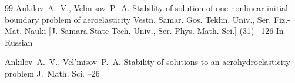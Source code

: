 \begin{thebibliography}{99}
\by Ankilov~A.~V., Velmisov~P.~A.
\paper Stability of solution of one nonlinear initial-boundary problem of aeroelasticity
\jour Vestn. Samar. Gos. Tekhn. Univ., Ser. Fiz.-Mat. Nauki \rm  [J. Samara State Tech. Univ., Ser. Phys. Math. Sci.]
(31)
--126
\lang In Russian

\by Ankilov~A.~V., Vel'misov~P.~A.
\paper Stability of solutions to an aerohydroelasticity problem
\jour  J.~Math. Sci.
--26

\end{thebibliography}

\newpage

%
